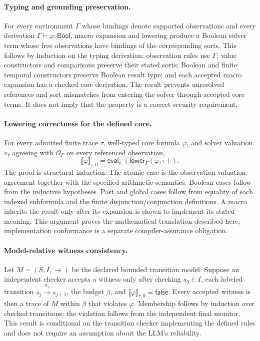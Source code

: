 \documentclass[journal]{IEEEtran}
\theoremstyle{definition}
\begin{document}
\paragraph{Typing and grounding preservation.}
For every environment $\Gamma$ whose bindings denote supported observations and every derivation $\Gamma\vdash\varphi:\mathsf{Bool}$, macro expansion and lowering produce a Boolean solver term whose free observations have bindings of the corresponding sorts. This follows by induction on the typing derivation: observation rules use $\Gamma$; value constructors and comparisons preserve their stated sorts; Boolean and finite temporal constructors preserve Boolean result type; and each accepted macro expansion has a checked core derivation. The result prevents unresolved references and sort mismatches from entering the solver through accepted core terms. It does not imply that the property is a correct security requirement.

\paragraph{Lowering correctness for the defined core.}
For every admitted finite trace $\tau$, well-typed core formula $\varphi$, and solver valuation $v_\tau$ agreeing with $\mathcal O_\Gamma$ on every referenced observation,
\[
\llbracket\varphi\rrbracket_{\tau,0}
=\mathsf{eval}_{v_\tau}(\mathsf{lower}_\Gamma(\varphi,\tau)).
\]
The proof is structural induction. The atomic case is the observation-valuation agreement together with the specified arithmetic semantics. Boolean cases follow from the inductive hypotheses. Past and global cases follow from equality of each indexed subformula and the finite disjunction/conjunction definitions. A macro inherits the result only after its expansion is shown to implement its stated meaning. This argument proves the mathematical translation described here; implementation conformance is a separate compiler-assurance obligation.

\paragraph{Model-relative witness consistency.}
Let $M=(S,I,\longrightarrow)$ be the declared bounded transition model. Suppose an independent checker accepts a witness only after checking $s_0\in I$, each labeled transition $s_j\mathrel{\mathop{\longrightarrow}\limits^{a_j}}s_{j+1}$, the budget $\beta$, and $\llbracket\varphi\rrbracket_{\tau,0}=\mathsf{false}$. Every accepted witness is then a trace of $M$ within $\beta$ that violates $\varphi$. Membership follows by induction over checked transitions; the violation follows from the independent final monitor. This result is conditional on the transition checker implementing the defined rules and does not require an assumption about the LLM's reliability.
\end{document}
